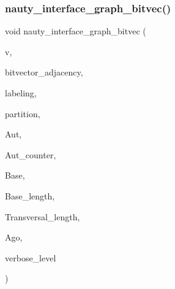 \subsubsection{\texorpdfstring{nauty\+\_\+interface\+\_\+graph\+\_\+bitvec()}{nauty\_interface\_graph\_bitvec()}}
{\footnotesize\ttfamily void nauty\+\_\+interface\+\_\+graph\+\_\+bitvec (\begin{DoxyParamCaption}\item[{\mbox{\hyperlink{galois_8h_a09fddde158a3a20bd2dcadb609de11dc}{I\+NT}}}]{v,  }\item[{\mbox{\hyperlink{galois_8h_a122c4acf389c050379f00341fdcd5812}{U\+B\+Y\+TE}} $\ast$}]{bitvector\+\_\+adjacency,  }\item[{\mbox{\hyperlink{galois_8h_a09fddde158a3a20bd2dcadb609de11dc}{I\+NT}} $\ast$}]{labeling,  }\item[{\mbox{\hyperlink{galois_8h_a09fddde158a3a20bd2dcadb609de11dc}{I\+NT}} $\ast$}]{partition,  }\item[{\mbox{\hyperlink{galois_8h_a09fddde158a3a20bd2dcadb609de11dc}{I\+NT}} $\ast$}]{Aut,  }\item[{\mbox{\hyperlink{galois_8h_a09fddde158a3a20bd2dcadb609de11dc}{I\+NT}} \&}]{Aut\+\_\+counter,  }\item[{\mbox{\hyperlink{galois_8h_a09fddde158a3a20bd2dcadb609de11dc}{I\+NT}} $\ast$}]{Base,  }\item[{\mbox{\hyperlink{galois_8h_a09fddde158a3a20bd2dcadb609de11dc}{I\+NT}} \&}]{Base\+\_\+length,  }\item[{\mbox{\hyperlink{galois_8h_a09fddde158a3a20bd2dcadb609de11dc}{I\+NT}} $\ast$}]{Transversal\+\_\+length,  }\item[{\mbox{\hyperlink{galois_8h_a09fddde158a3a20bd2dcadb609de11dc}{I\+NT}} \&}]{Ago,  }\item[{\mbox{\hyperlink{galois_8h_a09fddde158a3a20bd2dcadb609de11dc}{I\+NT}}}]{verbose\+\_\+level }\end{DoxyParamCaption})}

\mbox{\label{nauty__interface_8_c_a4e706766ff9e4a639f8dae923220b1fb}} 
